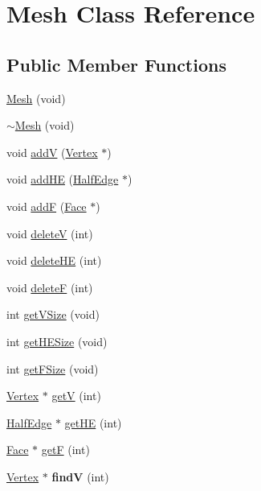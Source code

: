 \hypertarget{class_mesh}{\section{Mesh Class Reference}
\label{class_mesh}
}
\subsection*{Public Member Functions}
\begin{DoxyCompactItemize}
\item 
\hyperlink{class_mesh_a606978911c751958f2d69e69fba6bd5b}{Mesh} (void)
\item 
\hyperlink{class_mesh_a5d57b290621dea7bae044a18beac008a}{$\sim$\-Mesh} (void)
\item 
void \hyperlink{class_mesh_a8526806ec2627c4549e893d25c510ec6}{add\-V} (\hyperlink{class_vertex}{Vertex} $\ast$)
\item 
void \hyperlink{class_mesh_ad041a376fca28a2fc9b123b25612eab3}{add\-H\-E} (\hyperlink{class_half_edge}{Half\-Edge} $\ast$)
\item 
void \hyperlink{class_mesh_a1db99b5513473178398014cb651d0cf7}{add\-F} (\hyperlink{class_face}{Face} $\ast$)
\item 
void \hyperlink{class_mesh_a8e901daf8b1fb9e1e44e04201eec9108}{delete\-V} (int)
\item 
void \hyperlink{class_mesh_a7998f2c7ab170cef82a533008859d199}{delete\-H\-E} (int)
\item 
void \hyperlink{class_mesh_a129e0e82375443c1a7078fb6b6d5f0ff}{delete\-F} (int)
\item 
int \hyperlink{class_mesh_a81a4f79aa38bf2856bcfe8175e3e12b2}{get\-V\-Size} (void)
\item 
int \hyperlink{class_mesh_a404be995ec077a8736756e33dfa37d05}{get\-H\-E\-Size} (void)
\item 
int \hyperlink{class_mesh_a9e038ec494afbaa538dde90e830d4a34}{get\-F\-Size} (void)
\item 
\hyperlink{class_vertex}{Vertex} $\ast$ \hyperlink{class_mesh_ab9d6bbe005e63f41f5693680487d36ca}{get\-V} (int)
\item 
\hyperlink{class_half_edge}{Half\-Edge} $\ast$ \hyperlink{class_mesh_aa6dd0f2b08b6917fb644c0971c8d8c67}{get\-H\-E} (int)
\item 
\hyperlink{class_face}{Face} $\ast$ \hyperlink{class_mesh_af2d12cb093c787e2c5713a299aa65efc}{get\-F} (int)
\item 
\hypertarget{class_mesh_a4791e94a7d5b1446c08109ac6d48a4ef}{\hyperlink{class_vertex}{Vertex} $\ast$ {\bfseries find\-V} (int)}\label{class_mesh_a4791e94a7d5b1446c08109ac6d48a4ef}


\end{DoxyCompactItemize}
